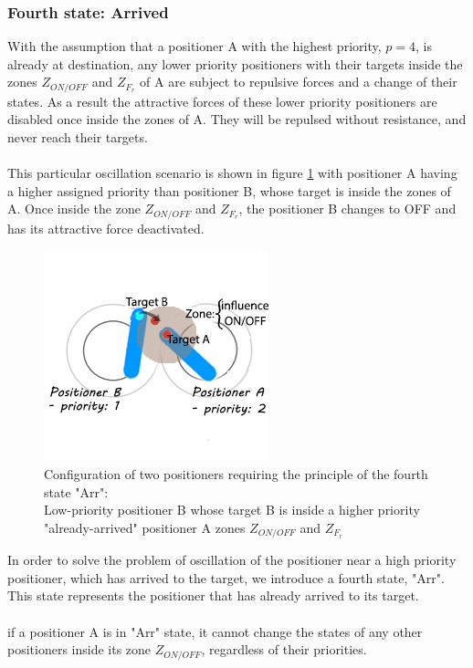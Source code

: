 \documentclass[]{spie}  %
\begin{document}
	\subsubsection{Fourth state: Arrived}
	\label{sub_chap_fourth_state}
	With the assumption that a positioner A with the highest priority, $p = 4$, is already at destination, any lower priority positioners with their targets inside the zones $Z_{ON/OFF}$ and $Z_{F_{r}}$ of A are subject to repulsive forces and a change of their states. As a result the attractive forces of these lower priority positioners are disabled once inside the zones of A. They will be repulsed without resistance, and never reach their targets.\\
	\\
	This particular oscillation scenario is shown in figure \ref{fourth_state} with positioner A having a higher assigned priority than positioner B, whose target is inside the zones of A. Once inside the zone $Z_{ON/OFF}$ and $Z_{F_{r}}$, the positioner B changes to OFF and has its attractive force deactivated.
	\begin{figure}[H]
		\centering
		\includegraphics[scale=0.64]{images/fourth_state.jpg}
		\caption{\centering	Configuration of two positioners requiring the principle of the fourth state "Arr":\\
		Low-priority positioner B whose target B is inside a higher priority "already-arrived" positioner A zones $Z_{ON/OFF}$ and $Z_{F_{r}}$ }
		\label{fourth_state}
	\end{figure}
	In order to solve the problem of oscillation of the positioner near a high priority positioner, which has arrived to the target, we introduce a fourth state, "Arr". This state represents the positioner that has already arrived to its target. \\\\
	if a positioner A is in "Arr" state, it cannot change the states of any other positioners inside its zone $Z_{ON/OFF}$, regardless of their priorities. 
\end{document}
